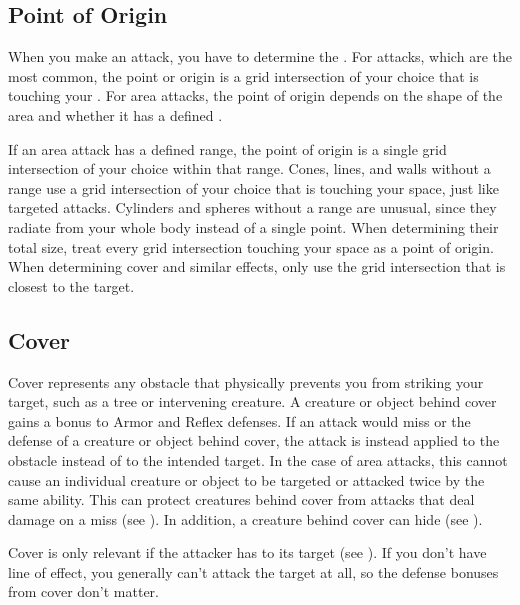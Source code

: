     \subsection{Point of Origin}\label{Point of Origin}
        When you make an attack, you have to determine the .
        For  attacks, which are the most common, the point or origin is a grid intersection of your choice that is touching your .
        For area attacks, the point of origin depends on the shape of the area and whether it has a defined .

        If an area attack has a defined range, the point of origin is a single grid intersection of your choice within that range.
        Cones, lines, and walls without a range use a grid intersection of your choice that is touching your space, just like targeted attacks.
        Cylinders and spheres without a range are unusual, since they radiate from your whole body instead of a single point.
        When determining their total size, treat every grid intersection touching your space as a point of origin.
        When determining cover and similar effects, only use the grid intersection that is closest to the target.

    \subsection{Cover}\label{Cover}

        Cover represents any obstacle that physically prevents you from striking your target, such as a tree or intervening creature.
        A creature or object behind cover gains a  bonus to Armor and Reflex defenses.
        If an attack would miss or  the defense of a creature or object behind cover,
            the attack is instead applied to the obstacle instead of to the intended target.
        In the case of area attacks, this cannot cause an individual creature or object to be targeted or attacked twice by the same ability.
        This can protect creatures behind cover from attacks that deal damage on a miss (see ).
        In addition, a creature behind cover can hide (see ).

        Cover is only relevant if the attacker has  to its target (see ).
        If you don't have line of effect, you generally can't attack the target at all, so the defense bonuses from cover don't matter.

